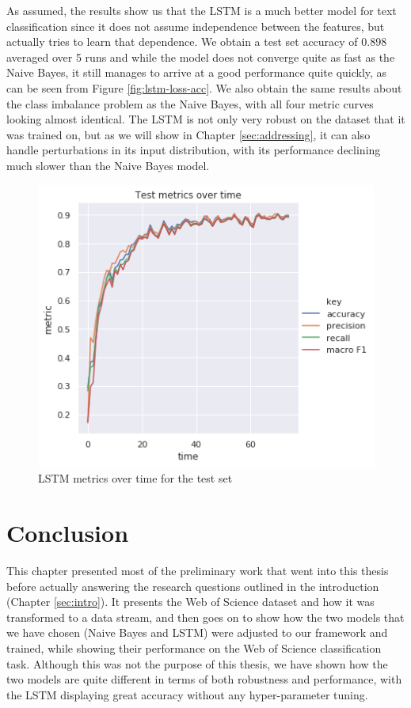 \documentclass[12pt]{extreport}
\begin{document}
As assumed, the results show us that the LSTM is a much better model for text classification since it does not assume independence between the features, but actually tries to learn that dependence. We obtain a test set accuracy of 0.898 averaged over 5 runs and while the model does not converge quite as fast as the Naive Bayes, it still manages to arrive at a good performance quite quickly, as can be seen from Figure \ref{fig:lstm-loss-acc}. We also obtain the same results about the class imbalance problem as the Naive Bayes, with all four metric curves looking almost identical. The LSTM is not only very robust on the dataset that it was trained on, but as we will show in Chapter \ref{sec:addressing}, it can also handle perturbations in its input distribution, with its performance declining much slower than the Naive Bayes model.

\begin{figure}[ht!]
\centering
\includegraphics[width=0.7\linewidth]{assets/framework/lstm_BERT_test_metrics_holdout.png}
\caption{LSTM metrics over time for the test set}
\label{fig:lstm-metrics}
\end{figure}

\section{Conclusion}

This chapter presented most of the preliminary work that went into this thesis before actually answering the research questions outlined in the introduction (Chapter \ref{sec:intro}). It presents the Web of Science dataset and how it was transformed to a data stream, and then goes on to show how the two models that we have chosen (Naive Bayes and LSTM) were adjusted to our framework and trained, while showing their performance on the Web of Science classification task. Although this was not the purpose of this thesis, we have shown how the two models are quite different in terms of both robustness and performance, with the LSTM displaying great accuracy without any hyper-parameter tuning.
\end{document}
